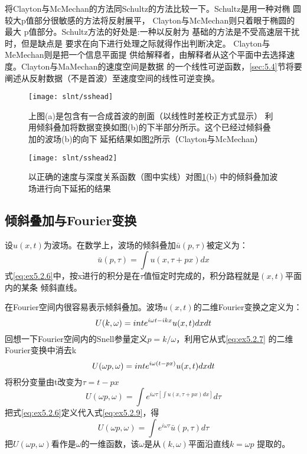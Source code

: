 将Clayton与McMechan的方法同Schultz的方法比较一下。Schultz是用一种对椭
圆较大p值部分很敏感的方法将反射展平，
Clayton与McMechan则只着眼于椭圆的最大
p值部分。Schultz方法的好处是:一种以反射为
基础的方法是不受高速层干扰时，但是缺点是
要求在向下进行处理之际就得作出判断决定。
Clayton与MeMechan则是把一个信息平面提
供给解释者，由解释者从这个平面中去选择速度。Clayton与MaMechan的速度空间是数据
的一个线性可逆函数，\ref{sec:5.4}节将要阐述从反射数据（不是首波）至速度空间的线性可逆变换。

\begin{figure}[H]
\centering
\texttt{[image: slnt/sshead]}
\caption[sshead]{上图(a)是包含有一合成首波的剖面（以线性时差校正方式显示）
利用倾斜叠加将数据变换如图(b)的下半部分所示。这个已经过倾斜叠加的波场(b)的向下
延拓结果如图\ref{fig:slnt/sshead2}所示（Clayton与McMechan）}
\label{fig:slnt/sshead}
\end{figure}

\begin{figure}[H]
\centering
\texttt{[image: slnt/sshead2]}
\caption[sshead2]{以正确的速度与深度关系函数（图中实线）对图\ref{fig:slnt/sshead}(b)
中的倾斜叠加波场进行向下延拓的结果}
\label{fig:slnt/sshead2}
\end{figure}

\subsection{倾斜叠加与Fourier变换}
\label{sec:5.2.6}

设$u(x,t)$为波场。在数学上，波场的倾斜叠加$\bar{u}(p,\tau)$被定义为：
\begin{equation}
\bar{u}(p,\tau)=\int u(x,\tau+px)dx
\label{eq:ex5.2.6}
\end{equation}
式\ref{eq:ex5.2.6}中，按x进行的积分是在$\tau$值恒定时完成的，积分路程就是$(x,t)$平面内的某条
倾斜直线。

在Fourier空间内很容易表示倾斜叠加。波场$u(x,
t)$的二维Fourier变换之定义为：
\begin{equation}
U(k,\omega)=\\int e^{i\omega t-ikx}u(x,t)dxdt
\label{eq:ex5.2.7}
\end{equation}
回想一下Fourier空间内的Snell参量定义$p=k/\omega$，利用它从式\ref{eq:ex5.2.7}
的二维Fourier变换中消去k
\begin{equation}
U(\omega p,\omega)=\\int e^{i\omega(t-px)}u(x,t)dxdt
\label{eq:ex5.2.8}
\end{equation}
将积分变量由t改变为$\tau=t-px$
\begin{equation}
U(\omega p,\omega)=\int e^{i\omega\tau[\int u(x,\tau+px)dx]}d\tau
\label{eq:ex5.2.9}
\end{equation}
把式\ref{eq:ex5.2.6}定义代入式\ref{eq:ex5.2.9}，得
\begin{equation}
U(\omega p,\omega)=\int e^{i\omega\tau} \bar{u}(p,\tau) d\tau
\label{eq:ex5.2.10}
\end{equation}
把$U(\omega p,\omega)$看作是$\omega$的一维函数，该$\omega$是从$(k,\omega)$平面沿直线$k=\omega p$
提取的。

